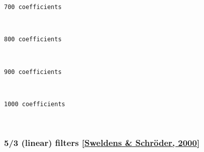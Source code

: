     \begin{Verbatim}[commandchars=\\\{\}]
700 coefficients
    \end{Verbatim}

    \begin{center}
    \end{center}
    { \hspace*{\fill} \\}
    
    \begin{Verbatim}[commandchars=\\\{\}]
800 coefficients
    \end{Verbatim}

    \begin{center}
    \end{center}
    { \hspace*{\fill} \\}
    
    \begin{Verbatim}[commandchars=\\\{\}]
900 coefficients
    \end{Verbatim}

    \begin{center}
    \end{center}
    { \hspace*{\fill} \\}
    
    \begin{Verbatim}[commandchars=\\\{\}]
1000 coefficients
    \end{Verbatim}

    \begin{center}
    \end{center}
    { \hspace*{\fill} \\}
    
    \hypertarget{linear-filters-sweldens-schruxf6der-2000}{%
\subsubsection{\texorpdfstring{5/3 (linear) filters
\href{https://scholar.google.es/scholar?hl=es\&as_sdt=0\%2C5\&q=building+wavelets+at+home\&btnG==}{{[}Sweldens
\& Schröder,
2000{]}}}{5/3 (linear) filters {[}Sweldens \& Schröder, 2000{]}}}\label{linear-filters-sweldens-schruxf6der-2000}}

